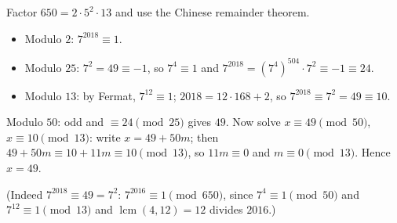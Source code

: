 Factor $650=2\cdot5^2\cdot13$ and use the Chinese remainder theorem.
\begin{itemize}
\item Modulo $2$: $7^{2018}\equiv1$.
\item Modulo $25$: $7^2=49\equiv-1$, so $7^4\equiv1$ and $7^{2018}=\left(7^4\right)^{504}\cdot7^2\equiv-1\equiv24$.
\item Modulo $13$: by Fermat, $7^{12}\equiv1$; $2018=12\cdot168+2$, so $7^{2018}\equiv7^2=49\equiv10$.
\end{itemize}
Modulo $50$: odd and $\equiv24\pmod{25}$ gives $49$. Now solve $x\equiv49\pmod{50}$, $x\equiv10\pmod{13}$: write $x=49+50m$; then $49+50m\equiv10+11m\equiv10\pmod{13}$, so $11m\equiv0$ and $m\equiv0\pmod{13}$. Hence $x=\boxed{49}$.

(Indeed $7^{2018}\equiv49=7^2$: $7^{2016}\equiv1\pmod{650}$, since $7^4\equiv1\pmod{50}$ and $7^{12}\equiv1\pmod{13}$ and $\operatorname{lcm}(4,12)=12$ divides $2016$.)
